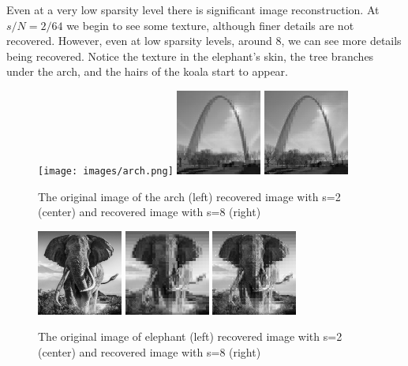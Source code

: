 \documentclass{article}
\begin{document}
Even at a very low sparsity level there is significant image reconstruction.
At $s/N = 2/64$ we begin to see some texture, although finer details are not recovered.
However, even at low sparsity levels, around 8, we can see more details being recovered.
Notice the texture in the elephant's skin, the tree branches under the arch, and the hairs of the koala start to appear.

\begin{figure}[h]
    \captionsetup{width=.5\linewidth}
    \centering
        \texttt{[image: images/arch.png]}
        \includegraphics[width=0.25\textwidth]{images/arch-recovered_02.png}
        \includegraphics[width=0.25\textwidth]{images/arch-recovered_08.png}
        \caption{The original image of the arch (left) recovered image with s=2 (center) and recovered image with s=8 (right)}
\end{figure}

\begin{figure}[h]
    \captionsetup{width=.5\linewidth}
    \centering
        \includegraphics[width=0.25\textwidth]{images/elephant.png}
        \includegraphics[width=0.25\textwidth]{images/elephant-recovered_02.png}
        \includegraphics[width=0.25\textwidth]{images/elephant-recovered_08.png}
        \caption{The original image of elephant (left) recovered image with s=2 (center) and recovered image with s=8 (right)}
\end{figure}
\end{document}
